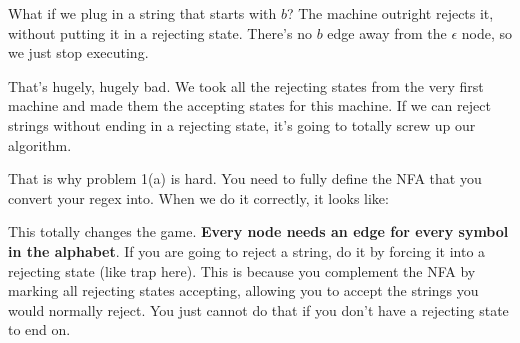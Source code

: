 \documentclass{report}
\begin{document}
    What if we plug in a string that starts with $b$?
    The machine outright rejects it, without putting it in a rejecting state.
    There's no $b$ edge away from the $\epsilon$ node, so we just stop executing.

    That's hugely, hugely bad. We took all the rejecting states from the very first machine and made them the accepting states for this machine.
    If we can reject strings without ending in a rejecting state, it's going to totally screw up our algorithm.

    That is why problem 1(a) is hard. You need to fully define the NFA that you convert your regex into.
    When we do it correctly, it looks like:

    \begin{figure}[H] %
        \centering %
        \caption*{}
        \label{fig:withtrap}
    \end{figure}

    This totally changes the game. \textbf{Every node needs an edge for every symbol in the alphabet}.
    If you are going to reject a string, do it by forcing it into a rejecting state (like trap here).
    This is because you complement the NFA by marking all rejecting states accepting, allowing you to accept the strings you would normally reject.
    You just cannot do that if you don't have a rejecting state to end on.
\end{document}
